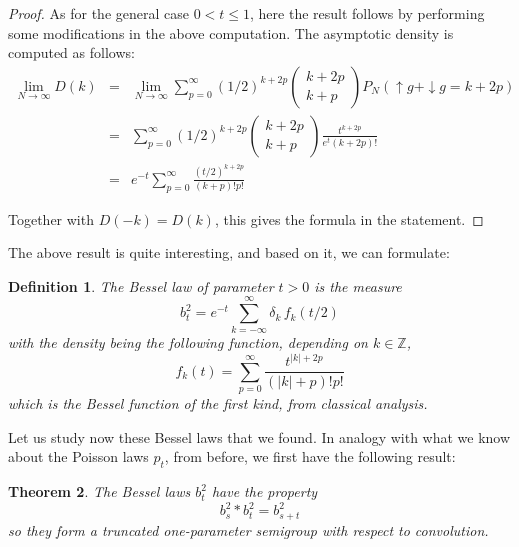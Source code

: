 \documentclass[12pt]{amsbook}
\newtheorem{theorem}{Theorem}[chapter]
\newtheorem{definition}[theorem]{Definition}
\begin{document}
\begin{proof}
As for the general case $0<t\leq 1$, here the result follows by performing some modifications in the above computation. The asymptotic density is computed as follows:
\begin{eqnarray*}
\lim_{N\to\infty}D(k)
&=&\lim_{N\to\infty}\sum_{p=0}^\infty(1/2)^{k+2p}\begin{pmatrix}k+2p\\ k+p\end{pmatrix} P_N(\uparrow g+\downarrow g=k+2p)\\
&=&\sum_{p=0}^\infty(1/2)^{k+2p}\begin{pmatrix}k+2p\\
k+p\end{pmatrix}\frac{t^{k+2p}}{e^t(k+2p)!}\\
&=&e^{-t}\sum_{p=0}^\infty \frac{(t/2)^{k+2p}}{(k+p)!p!}
\end{eqnarray*}

Together with $D(-k)=D(k)$, this gives the formula in the statement.
\end{proof}

The above result is quite interesting, and based on it, we can formulate:


\begin{definition}
The Bessel law of parameter $t>0$ is the measure
$$b^2_t=e^{-t}\sum_{k=-\infty}^\infty\delta_k\,f_k(t/2)$$
with the density being the following function, depending on $k\in\mathbb Z$,
$$f_k(t)=\sum_{p=0}^\infty \frac{t^{|k|+2p}}{(|k|+p)!p!}$$
which is the Bessel function of the first kind, from classical analysis.
\end{definition}

Let us study now these Bessel laws that we found. In analogy with what we know about the Poisson laws $p_t$, from before, we first have the following result:


\begin{theorem}
The Bessel laws $b^2_t$ have the property
$$b^2_s*b^2_t=b^2_{s+t}$$
so they form a truncated one-parameter semigroup with respect to convolution.
\end{theorem}
\end{document}
